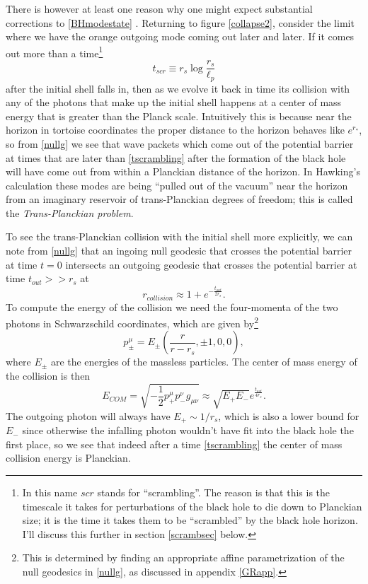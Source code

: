 \documentclass[12pt]{article}
\newcommand{\be}{\begin{equation}}
\newcommand{\ee}{\end{equation}}
\begin{document}
There is however at least one reason why one might expect substantial corrections to \eqref{BHmodestate} \cite{'tHooft:1984re,Unruh:1994zw,Corley:1996ar}.  Returning to figure \ref{collapse2}, consider the limit where we have the orange outgoing mode coming out later and later.  If it comes out more than a time\footnote{In this name $scr$ stands for ``scrambling''. The reason is that this is the timescale it takes for perturbations of the black hole to die down to Planckian size; it is the time it takes them to be ``scrambled'' by the black hole horizon.  I'll discuss this further in section \ref{scrambsec} below.}
\be\label{tscrambling}
t_{\mathit{scr}}\equiv r_s\log \frac{r_s}{\ell_p}
\ee
after the initial shell falls in, then as we evolve it back in time its collision with any of the photons that make up the initial shell happens at a center of mass energy that is greater than the Planck scale.  Intuitively this is because near the horizon in tortoise coordinates the proper distance to the horizon behaves like $e^{r_*}$, so from \eqref{nullg} we see that wave packets which come out of the potential barrier at times that are later than \eqref{tscrambling} after the formation of the black hole will have come out from within a Planckian distance of the horizon.  In Hawking's calculation these modes are being ``pulled out of the vacuum'' near the horizon from an imaginary reservoir of trans-Planckian degrees of freedom;  this is called the \textit{Trans-Planckian problem}.

To see the trans-Planckian collision with the initial shell more explicitly,  we can note from \eqref{nullg} that an ingoing null geodesic that crosses the potential barrier at time $t=0$ intersects an outgoing geodesic that crosses the potential barrier at time $t_{\mathit{out}}>>r_s$ at
\be
r_{\mathit{collision}}\approx 1+e^{-\frac{t_{\mathit{out}}}{2r_s}}.
\ee
To compute the energy of the collision we need the four-momenta of the two photons in Schwarzschild coordinates, which are given by\footnote{This is determined by finding an appropriate affine parametrization of the null geodesics in \eqref{nullg}, as discussed in appendix \ref{GRapp}.}
\be
p^\mu_\pm=E_\pm\left(\frac{r}{r-r_s},\pm 1,0,0\right),  
\ee
where $E_\pm$ are the energies of the massless particles.  The center of mass energy of the collision is then
\be
E_{COM}=\sqrt{-\frac{1}{2}p_+^\mu p_-^\nu g_{\mu\nu}}\approx\sqrt{E_+ E_-}e^{\frac{t_{\mathit{out}}}{4r_s}}.
\ee
The outgoing photon will always have $E_+\sim 1/r_s$, which is also a lower bound for $E_-$ since otherwise the infalling photon wouldn't have fit into the black hole the first place, so we see that indeed after a time \eqref{tscrambling} the center of mass collision energy is Planckian.  
\end{document}
